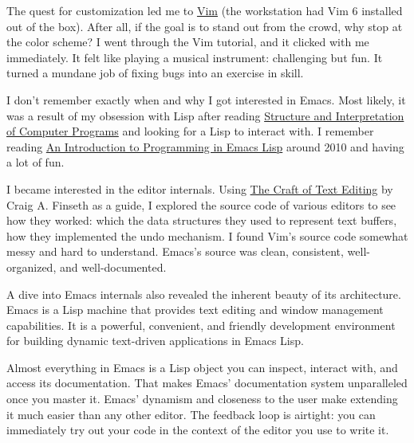 \documentclass{article}
\begin{document}
The quest for customization led me to \href{https://www.vim.org/}{Vim} (the workstation had Vim 6 installed out of the box).
After all, if the goal is to stand out from the crowd, why stop at the color scheme?
I went through the Vim tutorial, and it clicked with me immediately.
It felt like playing a musical instrument: challenging but fun.
It turned a mundane job of fixing bugs into an exercise in skill.

I don't remember exactly when and why I got interested in Emacs.
Most likely, it was a result of my obsession with Lisp after reading \href{https://en.wikipedia.org/wiki/Structure_and_Interpretation_of_Computer_Programs}{Structure and Interpretation of Computer Programs} and looking for a Lisp to interact with.
I remember reading \href{https://www.gnu.org/software/emacs/manual/eintr.html}{An Introduction to Programming in Emacs Lisp} around 2010 and having a lot of fun.

I became interested in the editor internals.
Using \href{https://www.finseth.com/craft/}{The Craft of Text Editing} by Craig A. Finseth as a guide, I explored the source code of various editors to see how they worked: which the data structures they used to represent text buffers, how they implemented the undo mechanism.
I found Vim's source code somewhat messy and hard to understand.
Emacs's source was clean, consistent, well-organized, and well-documented.

A dive into Emacs internals also revealed the inherent beauty of its architecture.
Emacs is a Lisp machine that provides text editing and window management capabilities.
It is a powerful, convenient, and friendly development environment for building dynamic text-driven applications in Emacs Lisp.

Almost everything in Emacs is a Lisp object you can inspect, interact with, and access its documentation.
That makes Emacs' documentation system unparalleled once you master it.
Emacs' dynamism and closeness to the user make extending it much easier than any other editor.
The feedback loop is airtight: you can immediately try out your code in the context of the editor you use to write it.
\end{document}
